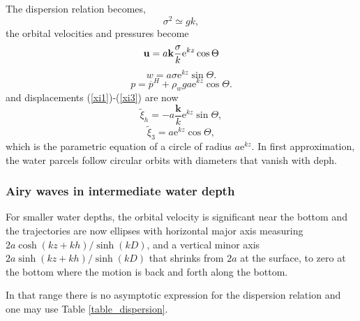 The dispersion relation becomes, 
\begin{equation}
    \sigma^2 \simeq g k,
     \label{dispersion deep}
\end{equation}
the orbital velocities and pressures become
\begin{equation}
    \mathbf{u}=a{\mathbf k}\frac{\sigma}{k}
    {\mathrm e}^{kz}    \cos \Theta
\end{equation}
\begin{equation}
    w=a \sigma
    {\mathrm e}^{kz}    \sin \Theta.
\end{equation}
\begin{equation}
    p=\overline{p}^H+ \rho_w g a
    {\mathrm e}^{kz}    \cos \Theta.
\end{equation}
and displacements (\ref{xi1})-(\ref{xi3}) are now
\begin{equation}
    \widetilde{\xi}_h=-a \frac{\mathbf k}{k}
    {\mathrm e}^{kz}  \sin \Theta,
\end{equation}
\begin{equation}
    \widetilde{\xi}_3= a {\mathrm e}^{kz}  \cos \Theta,
\end{equation}
which is the parametric equation of a circle of radius $a {\mathrm e}^{kz}$.
In first approximation, the water parcels follow circular orbits with diameters that vanish with deph. 
 
\subsubsection{Airy waves in intermediate water depth}
For smaller water depths, the orbital velocity is significant near the bottom 
and the trajectories are now ellipses with horizontal major axis measuring 
$2 a
{\cosh\left(kz+kh\right)}/{\sinh\left(kD\right)}$, and 
a vertical minor axis $2 a
{\sinh\left(kz+kh\right)}/{\sinh\left(kD\right)}$ that shrinks from $2a$ at the surface, 
to zero at the bottom where the motion is back and forth along the 
bottom.

In that range there is no asymptotic expression for the dispersion relation and one may use Table \ref{table_dispersion}. 

